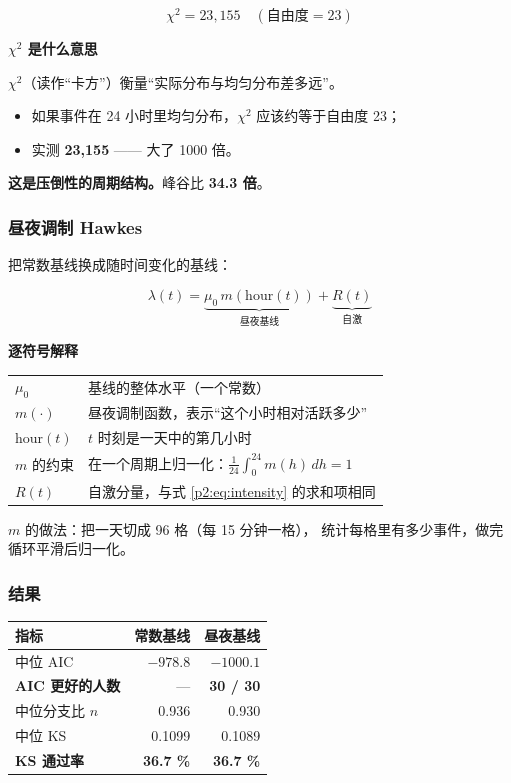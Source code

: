 \documentclass[UTF8,a4paper,11pt]{ctexart}
\newenvironment{explainbox}[1]
{\begin{center}\begin{minipage}{0.94\textwidth}\colorbox{boxbg}{\parbox{0.92\textwidth}{\textbf{#1}\par\vspace{2pt}}}}
{\end{minipage}\end{center}}
\newcommand{\hl}[1]{\textcolor{blue!70!black}{\textbf{#1}}}
\newcommand{\warn}[1]{\textcolor{red!70!black}{\textbf{#1}}}
\begin{document}
\begin{equation}
\chi^2 = 23{,}155 \quad (\text{自由度} = 23)
\end{equation}

\begin{explainbox}{$\chi^2$ 是什么意思}
$\chi^2$（读作“卡方”）衡量“实际分布与均匀分布差多远”。
\begin{itemize}[leftmargin=1.4em,itemsep=1pt]
\item 如果事件在 24 小时里均匀分布，$\chi^2$ 应该约等于自由度 23；
\item 实测 \textbf{23,155} —— 大了 1000 倍。
\end{itemize}
\textbf{这是压倒性的周期结构。}峰谷比 \textbf{34.3 倍}。
\end{explainbox}

\subsubsection{昼夜调制 Hawkes}

把常数基线换成随时间变化的基线：

\begin{equation}
\lambda(t) = \underbrace{\mu_0\, m(\text{hour}(t))}_{\text{昼夜基线}} + \underbrace{R(t)}_{\text{自激}}
\label{p2:eq:circadian}
\end{equation}

\begin{explainbox}{逐符号解释}
\begin{longtable}{@{}p{2.4cm}p{11.4cm}@{}}
$\mu_0$ & 基线的整体水平（一个常数） \\
$m(\cdot)$ & 昼夜调制函数，表示“这个小时相对活跃多少” \\
$\text{hour}(t)$ & $t$ 时刻是一天中的第几小时 \\
$m$ 的约束 & 在一个周期上归一化：$\frac{1}{24}\int_0^{24} m(h)\,dh = 1$ \\
$R(t)$ & 自激分量，与式 \eqref{p2:eq:intensity} 的求和项相同 \\
\end{longtable}
$m$ 的做法：把一天切成 96 格（每 15 分钟一格），
统计每格里有多少事件，做完循环平滑后归一化。
\end{explainbox}

\subsubsection{结果}

\begin{center}
\begin{tabular}{p{4.6cm}rr}
\toprule
\textbf{指标} & \textbf{常数基线} & \textbf{昼夜基线} \\
\midrule
中位 AIC & $-978.8$ & \hl{$-1000.1$} \\
\textbf{AIC 更好的人数} & --- & \hl{\textbf{30 / 30}} \\
中位分支比 $n$ & 0.936 & 0.930 \\
中位 KS & 0.1099 & 0.1089 \\
\textbf{KS 通过率} & \textbf{36.7 \%} & \warn{\textbf{36.7 \%}} \\
\bottomrule
\end{tabular}
\end{center}
\end{document}
